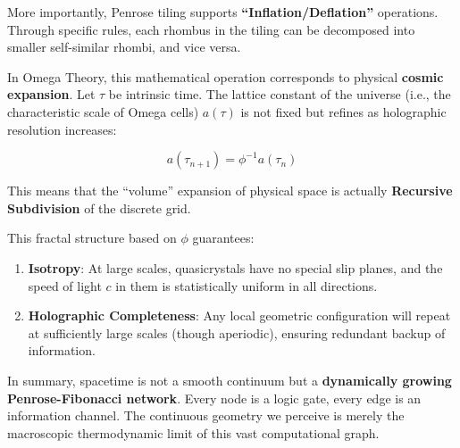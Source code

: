 More importantly, Penrose tiling supports \textbf{``Inflation/Deflation''} operations. Through specific rules, each rhombus in the tiling can be decomposed into smaller self-similar rhombi, and vice versa.

In Omega Theory, this mathematical operation corresponds to physical \textbf{cosmic expansion}.
Let $\tau$ be intrinsic time. The lattice constant of the universe (i.e., the characteristic scale of Omega cells) $a(\tau)$ is not fixed but refines as holographic resolution increases:

\[a(\tau_{n+1}) = \phi^{-1} a(\tau_n)\]

This means that the ``volume'' expansion of physical space is actually \textbf{Recursive Subdivision} of the discrete grid.

This fractal structure based on $\phi$ guarantees:

\begin{enumerate}
\item \textbf{Isotropy}: At large scales, quasicrystals have no special slip planes, and the speed of light $c$ in them is statistically uniform in all directions.
\item \textbf{Holographic Completeness}: Any local geometric configuration will repeat at sufficiently large scales (though aperiodic), ensuring redundant backup of information.
\end{enumerate}

In summary, spacetime is not a smooth continuum but a \textbf{dynamically growing Penrose-Fibonacci network}. Every node is a logic gate, every edge is an information channel. The continuous geometry we perceive is merely the macroscopic thermodynamic limit of this vast computational graph.
